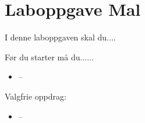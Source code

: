 
\noindent
\section*{Laboppgave Mal}

\vskip 5pt
I denne laboppgaven skal du....

Før du  starter må du......
\begin{itemize}[noitemsep]
	\item --
\end{itemize}

\vskip 5pt 
Valgfrie oppdrag:

\vskip 5pt 
\begin{itemize}[noitemsep]
	\item --
\end{itemize}



